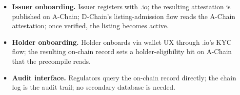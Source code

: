 \begin{itemize}[leftmargin=1.2em]
  \item \textbf{Issuer onboarding.} Issuer registers with
        \Liquidity{}.io; the resulting attestation is published on
        A-Chain; \Zoo{} D-Chain's listing-admission flow reads the
        A-Chain attestation; once verified, the listing becomes
        active.
  \item \textbf{Holder onboarding.} Holder onboards via wallet UX
        through \Liquidity{}.io's KYC flow; the resulting on-chain
        record sets a holder-eligibility bit on A-Chain that the
        precompile reads.
  \item \textbf{Audit interface.} Regulators query the on-chain
        record directly; the chain log is the audit trail; no
        secondary database is needed.
\end{itemize}
